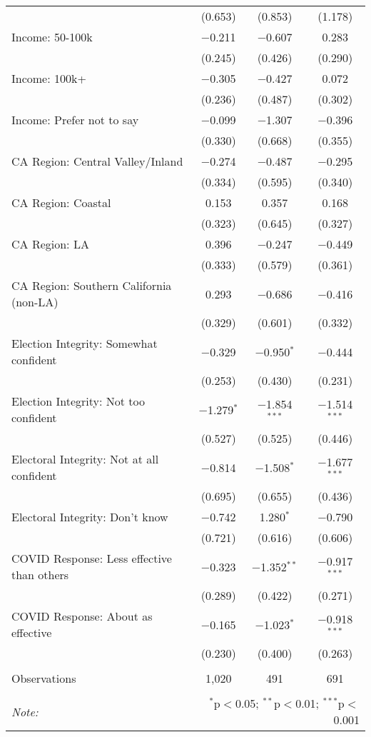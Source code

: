 \begin{table}[!htbp]
\begin{tabular}{@{\extracolsep{5pt}}lccc}
  & (0.653) & (0.853) & (1.178) \\ 
  Income: 50-100k & $-$0.211 & $-$0.607 & 0.283 \\ 
  & (0.245) & (0.426) & (0.290) \\ 
  Income: 100k+ & $-$0.305 & $-$0.427 & 0.072 \\ 
  & (0.236) & (0.487) & (0.302) \\ 
  Income: Prefer not to say & $-$0.099 & $-$1.307 & $-$0.396 \\ 
  & (0.330) & (0.668) & (0.355) \\ 
  CA Region: Central Valley/Inland & $-$0.274 & $-$0.487 & $-$0.295 \\ 
  & (0.334) & (0.595) & (0.340) \\ 
  CA Region: Coastal & 0.153 & 0.357 & 0.168 \\ 
  & (0.323) & (0.645) & (0.327) \\ 
  CA Region: LA & 0.396 & $-$0.247 & $-$0.449 \\ 
  & (0.333) & (0.579) & (0.361) \\ 
  CA Region: Southern California (non-LA) & 0.293 & $-$0.686 & $-$0.416 \\ 
  & (0.329) & (0.601) & (0.332) \\ 
  Election Integrity: Somewhat confident & $-$0.329 & $-$0.950$^{*}$ & $-$0.444 \\ 
  & (0.253) & (0.430) & (0.231) \\ 
  Election Integrity: Not too confident & $-$1.279$^{*}$ & $-$1.854$^{***}$ & $-$1.514$^{***}$ \\ 
  & (0.527) & (0.525) & (0.446) \\ 
  Electoral Integrity: Not at all confident & $-$0.814 & $-$1.508$^{*}$ & $-$1.677$^{***}$ \\ 
  & (0.695) & (0.655) & (0.436) \\ 
  Electoral Integrity: Don't know & $-$0.742 & 1.280$^{*}$ & $-$0.790 \\ 
  & (0.721) & (0.616) & (0.606) \\ 
  COVID Response: Less effective than others & $-$0.323 & $-$1.352$^{**}$ & $-$0.917$^{***}$ \\ 
  & (0.289) & (0.422) & (0.271) \\ 
  COVID Response: About as effective & $-$0.165 & $-$1.023$^{*}$ & $-$0.918$^{***}$ \\ 
  & (0.230) & (0.400) & (0.263) \\ 
 \hline \\[-1.8ex] 
Observations & 1,020 & 491 & 691 \\ 
\hline 
\hline \\[-1.8ex] 
\textit{Note:}  & \multicolumn{3}{r}{$^{*}$p$<$0.05; $^{**}$p$<$0.01; $^{***}$p$<$0.001} \\ 
\end{tabular} 
\end{table} 
